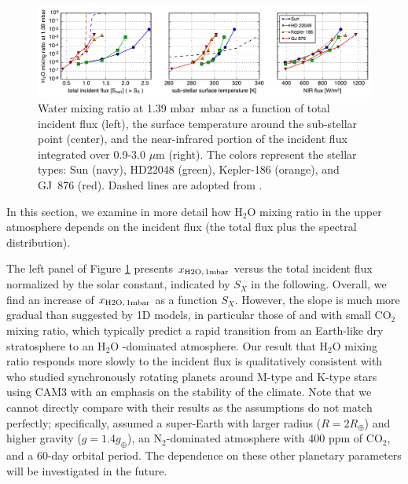 \documentclass[11pt,numberedappendix,twocolappendix,]{emulateapj}
\def\water{H$_2$O }
\def\xwater{$x_{\rm H2O,\,1mbar}$ }
\def\preslevel{1.39 mbar\ }
\begin{document}
\begin{figure}[!tb]
    \begin{center}
    \includegraphics[width=\hsize]{fig/xH2O_3panels.pdf}
    \end{center}
\caption{Water mixing ratio at \preslevel mbar as a function of total incident flux (left), the surface temperature around the sub-stellar point (center), and the near-infrared portion of the incident flux integrated over 0.9-3.0 $\mu $m (right). The colors represent the stellar types: Sun (navy), HD22048 (green), Kepler-186 (orange), and GJ~876 (red). Dashed lines are adopted from \citet{Kasting1993}. }                                                                                                             
\label{fig:xH2O_S0X}
\end{figure}

In this section, we examine in more detail how \water mixing ratio in the upper atmosphere depends on the incident flux (the total flux plus the spectral distribution). 

The left panel of Figure \ref{fig:xH2O_S0X} presents \xwater versus the total incident flux normalized by the solar constant, indicated by $S_X$ in the following. 
Overall, we find an increase of \xwater as a function $S_X$. 
However, the slope is much more gradual than suggested by 1D models, in particular those  of \citet{Kasting1993} and \citet{Wordsworth2013} with small CO$_2$ mixing ratio, which typically predict a rapid transition from an Earth-like dry stratosphere to an \water-dominated atmosphere. 
Our result that \water mixing ratio responds more slowly to the incident flux is qualitatively consistent with \citet{Yang2013} who studied synchronously rotating planets around M-type and K-type stars using CAM3 with an emphasis on the stability of the climate. 
Note that we cannot directly compare with their results as the assumptions do not match perfectly; specifically, \cite{Yang2013} assumed a super-Earth with larger radius ($R=2R_{\oplus}$) and higher gravity ($g=1.4g_{\oplus}$), an N$_2$-dominated atmosphere with 400 ppm of CO$_2$, and a 60-day orbital period. 
The dependence on these other planetary parameters will be investigated in the future. 
\end{document}

